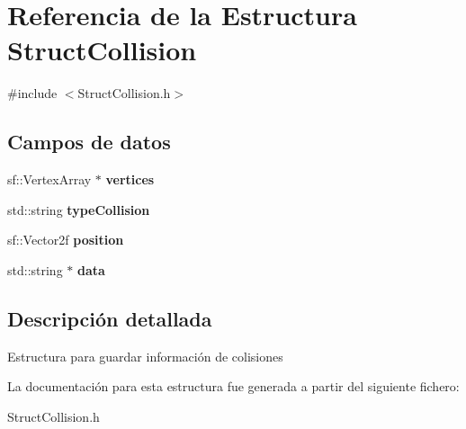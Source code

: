 \hypertarget{structStructCollision}{}\section{Referencia de la Estructura Struct\+Collision}
\label{structStructCollision}


{\ttfamily \#include $<$Struct\+Collision.\+h$>$}

\subsection*{Campos de datos}
\begin{DoxyCompactItemize}
\item 
\hypertarget{structStructCollision_a3b1bd19764801e168270763ce704523d}{}sf\+::\+Vertex\+Array $\ast$ {\bfseries vertices}\label{structStructCollision_a3b1bd19764801e168270763ce704523d}

\item 
\hypertarget{structStructCollision_a6f7f524aeef17b95b36e4d60dae2435a}{}std\+::string {\bfseries type\+Collision}\label{structStructCollision_a6f7f524aeef17b95b36e4d60dae2435a}

\item 
\hypertarget{structStructCollision_a43eba21f8c0c121d1a5f5693f7739119}{}sf\+::\+Vector2f {\bfseries position}\label{structStructCollision_a43eba21f8c0c121d1a5f5693f7739119}

\item 
\hypertarget{structStructCollision_a8b9b225135398133220aeffa1cc8fd18}{}std\+::string $\ast$ {\bfseries data}\label{structStructCollision_a8b9b225135398133220aeffa1cc8fd18}

\end{DoxyCompactItemize}


\subsection{Descripción detallada}
Estructura para guardar información de colisiones 

La documentación para esta estructura fue generada a partir del siguiente fichero\+:\begin{DoxyCompactItemize}
\item 
Struct\+Collision.\+h\end{DoxyCompactItemize}
